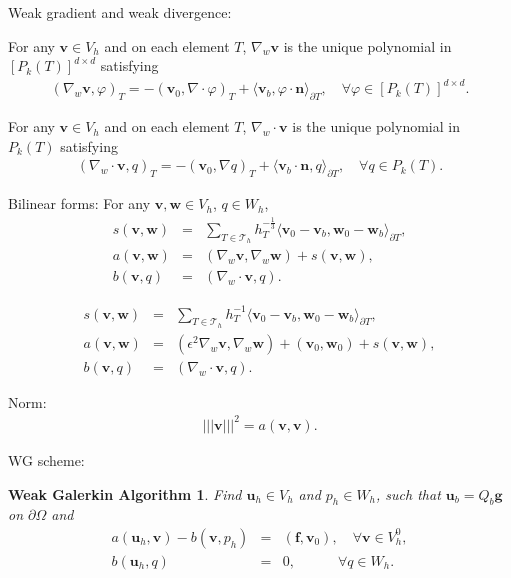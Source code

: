 \documentclass[leqno]{siamltex704}
\numberwithin{equation}{section}
\def\sumT{\sum_{T\in\mathcal{T}_h}}     %
\def\trb{|\!|\!|}
\def\la{\langle}
\def\ra{\rangle_{\partial T}}
\def\bw{{\mathbf{w}}}
\def\bu{{\mathbf{u}}}
\def\bv{{\mathbf{v}}}
\def\bn{{\mathbf{n}}}
\def\bf{{\mathbf{f}}}
\def\bg{{\mathbf{g}}}
\newtheorem{algorithm1}{Weak Galerkin Algorithm}
\begin{document}
Weak gradient and weak divergence:
\begin{definition}\label{def-wgrad}
  For any $\bv\in V_h$ and on each element $T$, $\nabla_w \bv$ is the unique polynomial in $[P_k(T)]^{d\times d}$
  satisfying
  \begin{eqnarray*}
    (\nabla_w \bv, \varphi)_T = -(\bv_0,\nabla\cdot\varphi)_T + \langle \bv_b , \varphi\cdot\bn\ra, \quad\forall \varphi\in [P_k(T)]^{d\times d}.
  \end{eqnarray*}
\end{definition}

\begin{definition}\label{def-wdiv}
  For any $\bv\in V_h$ and on each element $T$, $\nabla_w\cdot \bv$ is the unique polynomial in $P_k(T)$
  satisfying
  \begin{eqnarray*}
    (\nabla_w\cdot\bv, q)_T = -(\bv_0,\nabla q)_T + \langle \bv_b\cdot\bn , q\ra, \quad\forall q\in P_k(T).
  \end{eqnarray*}
\end{definition}

Bilinear forms:
For any $\bv,\bw \in V_h$, $q\in W_h$,
\begin{eqnarray*}
  s(\bv,\bw) &=& \sumT h_T^{-\frac13}\la \bv_0-\bv_b, \bw_0-\bw_b\ra,
  \\
  a(\bv,\bw) &=& (\nabla_w \bv,\nabla_w \bw) + s(\bv,\bw),
  \\
  b(\bv,q) &=& (\nabla_w\cdot \bv,q).
\end{eqnarray*}

{\color{red}
\begin{eqnarray*}
  s(\bv,\bw) &=& \sumT h_T^{-1}\la \bv_0-\bv_b, \bw_0-\bw_b\ra,
  \\
  a(\bv,\bw) &=& (\epsilon^2\nabla_w \bv,\nabla_w \bw)+(\bv_0,\bw_0) + s(\bv,\bw),
  \\
  b(\bv,q) &=& (\nabla_w\cdot \bv,q).
\end{eqnarray*}
}

Norm:
\begin{eqnarray*}
  \trb \bv\trb^2 = a(\bv,\bv).
\end{eqnarray*}

WG scheme:
\begin{algorithm1}\label{wg-alg}
  Find $\bu_h\in V_h$ and $p_h\in W_h$, such that $\bu_b = Q_b \bg$ on $\partial\Omega$ and
  \begin{eqnarray}\label{wg-scheme1}
    a(\bu_h , \bv) - b(\bv,p_h) &=& (\bf,\bv_0),\quad \forall \bv\in V_h^0,
    \\ \label{wg-scheme2}
    b(\bu_h,q) &=& 0, \quad\quad\quad\forall q\in W_h.
  \end{eqnarray}
\end{algorithm1}
\end{document}
